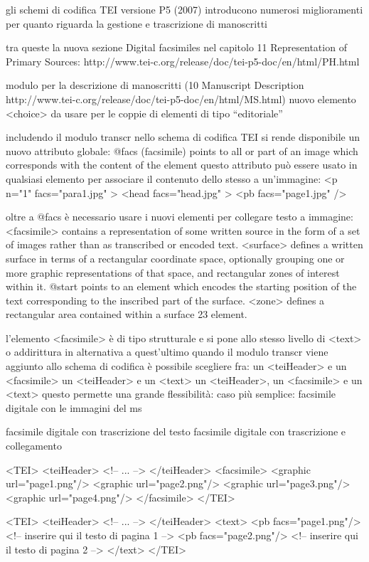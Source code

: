 gli schemi di codifica TEI versione P5 (2007) introducono numerosi miglioramenti per quanto riguarda la gestione e trascrizione di manoscritti

tra queste la nuova sezione Digital facsimiles nel capitolo 11 Representation of Primary Sources:
http://www.tei-c.org/release/doc/tei-p5-doc/en/html/PH.html

modulo per la descrizione di manoscritti (10 Manuscript
Description http://www.tei-c.org/release/doc/tei-p5-doc/en/html/MS.html)
nuovo elemento <choice> da usare per le coppie di elementi
di tipo “editoriale”

includendo il modulo transcr nello schema di codifica TEI si rende disponibile un nuovo attributo globale:
@facs (facsimile) points to all or part of an image which corresponds with the content of the element
questo attributo può essere usato in qualsiasi elemento per associare il contenuto dello stesso a un’immagine:
<p n="1" facs="para1.jpg" >
<head facs="head.jpg" >
<pb facs="page1.jpg" />

oltre a @facs è necessario usare i nuovi elementi per collegare testo a immagine:
<facsimile> contains a representation of some written source in the form of a set of images rather than as transcribed or encoded text.
<surface> defines a written surface in terms of a rectangular coordinate space, optionally grouping one or more graphic representations of that space, and rectangular zones of interest within it.
@start points to an element which encodes the starting position of the text corresponding to the inscribed part of the surface.
<zone> defines a rectangular area contained within a surface 23 element.

l’elemento <facsimile> è di tipo strutturale e si pone allo stesso livello di <text> o addirittura in alternativa a quest’ultimo
quando il modulo transcr viene aggiunto allo schema di codifica è possibile scegliere fra:
un <teiHeader> e un <facsimile>
un <teiHeader> e un <text>
un <teiHeader>, un <facsimile> e un <text>
questo permette una grande flessibilità:
caso più semplice: facsimile digitale con le immagini del ms

facsimile digitale con trascrizione del testo facsimile digitale con trascrizione e collegamento

<TEI>
 <teiHeader>
 <!-- ... -->
 </teiHeader>
 <facsimile>
  <graphic url="page1.png"/>
  <graphic url="page2.png"/>
  <graphic url="page3.png"/>
  <graphic url="page4.png"/>
 </facsimile>
</TEI>

<TEI>
 <teiHeader>
 <!-- ... -->
 </teiHeader>
 <text>
  <pb facs="page1.png"/>
   <!-- inserire qui il testo di pagina 1 -->
  <pb facs="page2.png"/>
   <!-- inserire qui il testo di pagina 2 -->
 </text>
</TEI>

